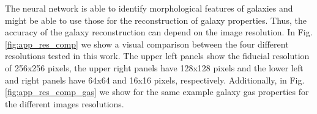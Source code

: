 \documentclass[conference]{IEEEtran}
\begin{document}
The neural network is able to identify morphological features of galaxies and might be able to use those for the reconstruction of galaxy properties. Thus, the accuracy of the galaxy reconstruction can depend on the image resolution. In Fig. \ref{fig:app_res_comp} we show a visual comparison between the four different resolutions tested in this work. The upper left panels show the fiducial resolution of 256x256 pixels, the upper right panels have 128x128 pixels and the lower left and right panels have 64x64 and 16x16 pixels, respectively. Additionally, in Fig. \ref{fig:app_res_comp_gas} we show for the same example galaxy gas properties for the different images resolutions.

% 
%
%


\label{lastpage}
\end{document}
